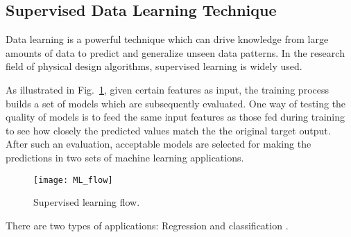 \subsection{Supervised Data Learning Technique}
Data learning is a powerful technique which can drive knowledge from large amounts of data to predict and generalize unseen data patterns. In the research field of physical design algorithms, supervised learning is widely used.

As illustrated in Fig.~\ref{fig:ml_flow}, given certain features as input, the training process builds a set of models which are subsequently evaluated. One way of testing the quality of models is to feed the same input features as those fed during training to see how closely the predicted values match the the original target output. After such an evaluation, acceptable models are selected for making the predictions in two sets of machine learning applications. 
\begin{figure}[tb!]
    \centering
    \texttt{[image: ML\_flow]}
    \caption{Supervised learning flow.}
    \label{fig:ml_flow}
\end{figure}
There are two types of applications: Regression and classification \cite{MLtypes}.
